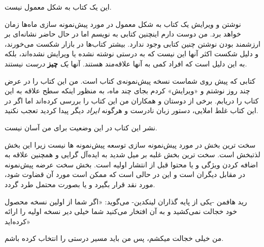 این یک کتاب به شکل معمول نیست.

نوشتن و ویرایش یک کتاب به شکل معمول در مورد پیش‌نمونه سازی ماه‌ها زمان
خواهد برد. من دوست دارم اینچنین کتابی به نویسم اما در حال حاضر نشانه‌ای
بر ارزشمند بودن نوشتن چنین کتابی وجود ندارد. بیشتر کتاب‌ها در بازار شکست
می‌خورند، و دلیل شکست اکثر آنها این نیست که به درستی نوشته نشده یا
ویرایش نشده‌اند، بلکه به این دلیل است که افراد کمی به آنها علاقه‌مند
هستند. آنها \emph{یک} \textbf{چیز} \emph{درست} نیستند.

کتابی که پیش روی شماست نسخه پیش‌نمونه‌ی کتاب است. من این کتاب را در عرض
چند روز نوشتم و «ویرایش» کردم بجای چند ماه، به منظور اینکه سطح علاقه به
این کتاب را دریابم. برخی از دوستان و همکاران من این کتاب را بررسی
کرده‌اند اما اگر در این کتاب غلط املایی، دستور زبان نادرست و هرگونه
\emph{ایراد} دیگر پیدا کردید تعجب نکنید.

نشر این کتاب در این وضعیت برای من آسان نیست.

سخت ترین بخش در مورد پیش‌نمونه سازی توسعه پیش‌نمونه ها نیست زیرا این بخش
لذتبخش است. سخت ترین بخش غلبه بر میل شدید به ایده‌آل گرایی و همچنین
علاقه به اضافه کردن ویژگی و یا محتوا قبل از انتشار اولیه است. بخش سخت
عرضه پیش‌نمونه در مقابل دیگران است و این در حالی است که ممکن است مورد آن
قضاوت شود، مورد نقد قرار بگیرد و یا بصورت محتمل طرد گردد.

رید هافمن -یکی از پایه گذاران لینکدین- می‌گوید: «اگر شما از اولین نسخه
محصول خود خجالت نمی‌کشید و به آن افتخار می‌کنید شما خیلی دیر نسخه اولیه
را ارائه کرده‌اید»

من خیلی خجالت میکشم، پس من باید مسیر درستی را انتخاب کرده باشم.
